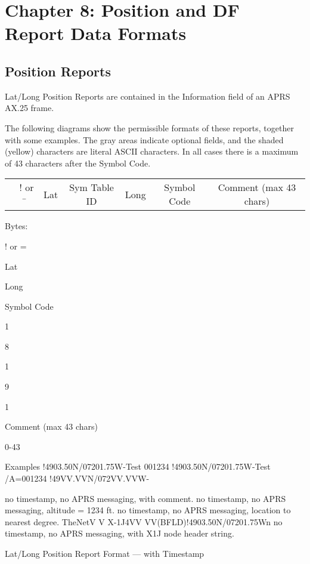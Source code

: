 \chapter{Chapter 8: Position and DF Report Data Formats}




\section{Position Reports}

Lat/Long Position Reports are contained in the Information field of an APRS AX.25 frame.

The following diagrams show the permissible formats of these reports,
together with some examples. The gray areas indicate optional fields, and the
shaded (yellow) characters are literal ASCII characters. In all cases there is a
maximum of 43 characters after the Symbol Code.

  \begin{tabular}{r|c|c|c|c|c|c|}
    & ! or \= & Lat & Sym Table ID & Long & Symbol Code & Comment (max 43 chars) \\
  \end{tabular}



Bytes:  
    
! or
=

Lat



Long

Symbol
Code

1

8

1

9

1

Comment
(max 43 chars)

0-43

Examples
!4903.50N/07201.75W-Test 001234
!4903.50N/07201.75W-Test /A=001234
!49VV.VVN/072VV.VVW-

no timestamp, no APRS messaging, with comment.
no timestamp, no APRS messaging, altitude = 1234 ft.
no timestamp, no APRS messaging, location to
nearest degree.
TheNetV
V X-1J4VV
VV(BFLD)!4903.50N/07201.75Wn no timestamp, no APRS messaging,
with X1J node header string.



Lat/Long Position Report Format — with Timestamp

